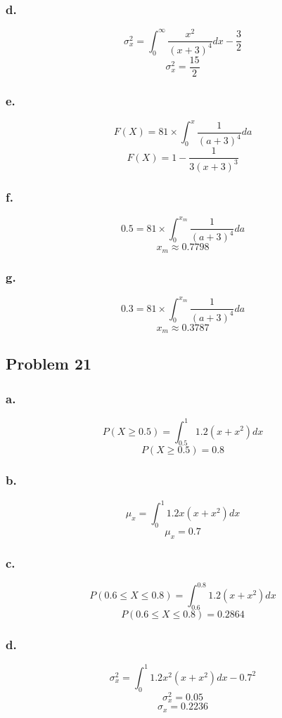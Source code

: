 \documentclass[11pt]{article}
\begin{document}
\subsubsection{d.}
\[ \sigma_x^2 = \int_{0}^{\infty} \frac{x^2}{{(x+3)}^4} dx - \frac{3}{2} \]
\[ \sigma_x^2 = \frac{15}{2} \]


\subsubsection{e.}
\[ F(X) = 81 \times \int_{0}^{x} \frac{1}{{(a+3)}^4} da \]
\[ F(X) = 1 - \frac{1}{3(x+3)^3} \]

\subsubsection{f.}
\[ 0.5 = 81 \times \int_{0}^{x_m} \frac{1}{{(a+3)}^4} da \]
\[ x_m \approx 0.7798 \]

\subsubsection{g.}
\[ 0.3 = 81 \times \int_{0}^{x_m} \frac{1}{{(a+3)}^4} da \]
\[ x_m \approx 0.3787 \]

\subsection{Problem 21}
\subsubsection{a.}
\[ P(X\ge0.5) = \int_{0.5}^{1} 1.2(x+x^2) dx \]
\[ P(X\ge0.5) = 0.8 \]
\subsubsection{b.}
\[ \mu_x = \int_{0}^{1} 1.2x(x+x^2) dx \]
\[ \mu_x = 0.7 \]

\subsubsection{c.}
\[ P(0.6\le X\le0.8) = \int_{0.6}^{0.8} 1.2(x+x^2) dx \]
\[ P(0.6\le X\le0.8) = 0.2864 \]

\subsubsection{d.}
\[ \sigma_x^2 = \int_{0}^{1} 1.2x^2(x+x^2) dx - 0.7^2 \]
\[ \sigma_x^2 = 0.05 \]
\[ \sigma_x = 0.2236 \]
\end{document}
